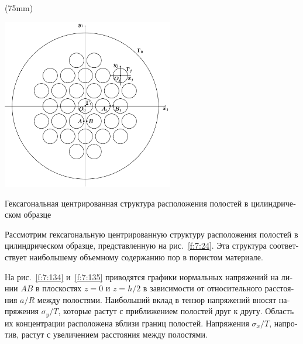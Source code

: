 \begin{russian}
\sidefig(75mm){
\includegraphics[width=7.5cm]{hexagonal-centroid.pdf}
\caption{Гексагональная центрированная структура расположения полостей в цилиндрическом образце}
\label{f:7:24}
}{Рассмотрим гексагональную центрированную структуру расположения полостей в цилиндрическом образце, представленную на рис.~\ref{f:7:24}. Эта структура соответствует наибольшему объемному содержанию пор в пористом материале.

На рис.~\ref{f:7:134} и~\ref{f:7:135} приводятся графики нормальных напряжений на линии $AB$ в плоскостях $z=0$ и $z=h/2$ в зависимости от относительного расстояния $a/R$ между полостями. Наибольший вклад в тензор напряжений вносят напряжения $\sigma_y/T$, которые растут с приближением полостей друг к другу. Область их концентрации расположена вблизи границ полостей. Напряжения $\sigma_x/T$, напротив, растут с увеличением расстояния между полостями. 
}


\end{russian}
